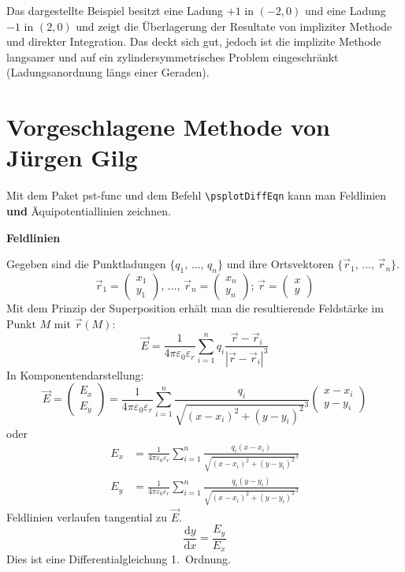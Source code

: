 \documentclass[11pt,english,ngerman,BCOR10mm,DIV12,bibliography=totoc,parskip=false,smallheadings
    headexclude,footexclude,oneside]{pst-doc}
\begin{document}
Das dargestellte Beispiel besitzt eine Ladung $+1$ in $(-2,0)$ und eine Ladung $-1$ in $(2,0)$ und 
zeigt die \"{U}berlagerung der Resultate von  impliziter Methode und direkter Integration. Das deckt 
sich gut, jedoch ist die implizite Methode langsamer und auf ein zylindersymmetrisches Problem 
eingeschr\"{a}nkt (Ladungsanordnung l\"{a}ngs einer Geraden).


\newpage
\section{Vorgeschlagene Methode von J\"{u}rgen Gilg}
Mit dem Paket \textsf{pst-func} und dem Befehl \verb+\psplotDiffEqn+ kann man Feldlinien \textbf{und} \"{A}quipotentiallinien zeichnen.

\textbf{Feldlinien}

Gegeben sind die Punktladungen $\{q_1, \,\ldots, \,q_n\}$ und ihre Ortsvektoren $\{\vec{r}_1, \,\ldots, \,\vec{r}_n\}$.
\begin{equation*}
\vec{r}_1=\begin{pmatrix}
x_1\\y_1
\end{pmatrix},\,\ldots,\,
\vec{r}_n=\begin{pmatrix}
x_n\\y_n
\end{pmatrix};\,
\vec{r}=\begin{pmatrix}
x\\y
\end{pmatrix}
\end{equation*}
Mit dem Prinzip der Superposition erh\"{a}lt man die resultierende Feldst\"{a}rke im Punkt $M$ mit $\overrightarrow{r}(M)$:
\begin{equation}
\vec{E} = \frac{1}{4 \pi \varepsilon_0 \varepsilon_r} \sum\limits_{i=1}^n q_i \frac{\vec{r} - \vec{r}_i}{|\vec{r} - \vec{r}_i|^3}
\end{equation}
In Komponentendarstellung:
\begin{equation}
\vec{E} =\begin{pmatrix}
E_x\\E_y
\end{pmatrix}=
 \frac{1}{4 \pi \varepsilon_0 \varepsilon_r} \sum\limits_{i=1}^n  \frac{q_i}{\sqrt{(x-x_i)^2+(y-y_i)^2}^3}\begin{pmatrix}
   x-x_i\\y-y_i
 \end{pmatrix}
\end{equation}
oder
\begin{align*}
E_x&=\frac{1}{4 \pi \varepsilon_0 \varepsilon_r} \sum\limits_{i=1}^n  \frac{q_i(x-x_i)}{\sqrt{(x-x_i)^2+(y-y_i)^2}^3}\\
E_y&=\frac{1}{4 \pi \varepsilon_0 \varepsilon_r} \sum\limits_{i=1}^n  \frac{q_i(y-y_i)}{\sqrt{(x-x_i)^2+(y-y_i)^2}^3}
\end{align*}
Feldlinien verlaufen tangential zu $\vec{E}$.
\begin{equation*}
\frac{\text{d}y}{\text{d}x}=\frac{E_y}{E_x}
\end{equation*}
Dies ist eine Differentialgleichung 1.~Ordnung.
\end{document}
